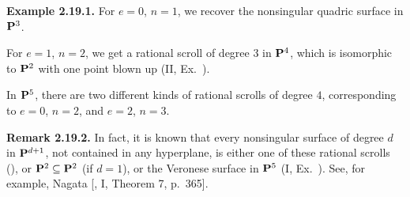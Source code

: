 {\medskip
\noindent\hypertarget{result-V-2.19.1}{}\textbf{Example 2.19.1.} For $e=0$, $n=1$, we recover the nonsingular quadric surface in $\mathbf{P}^3$.

For $e=1$, $n=2$, we get a rational scroll of degree $3$ in $\mathbf{P}^4$, which is isomorphic to $\mathbf{P}^2$ with one point blown up (II, Ex.~).

In $\mathbf{P}^5$, there are two different kinds of rational scrolls of degree $4$, corresponding to $e=0$, $n=2$, and $e=2$, $n=3$.

\medskip
\noindent\hypertarget{result-V-2.19.2}{}\textbf{Remark 2.19.2.} In fact, it is known that every nonsingular surface of degree $d$ in $\mathbf{P}^{d+1}$, not contained in any hyperplane, is either one of these rational scrolls (), or $\mathbf{P}^2\subseteq\mathbf{P}^2$ (if $d=1$), or the Veronese surface in $\mathbf{P}^5$ (I, Ex.~). See, for example, Nagata [, I, Theorem 7, p.~365].
}
